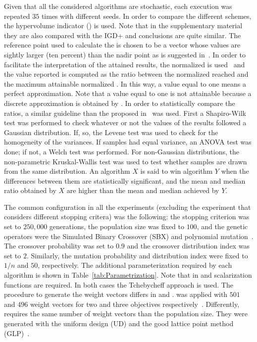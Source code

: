 Given that all the considered algorithms are stochastic, each execution was repeated $35$ times with different seeds.
%
In order to compare the different schemes, the hypervolume indicator (\HV{}) is used.
%
Note that in the supplementary material they are also compared with the IGD+ and conclusions are quite similar.
%
The reference point used to calculate the \HV{} is chosen to be a vector whose values are sightly larger (ten percent) than the nadir point 
as is suggested in~\cite{ishibuchi2017reference}.
%
In order to facilitate the interpretation of the attained results, the normalized \HV{} is used~\cite{li2015evolutionary}
and the value reported is computed as the ratio between the normalized \HV{} reached and the maximum attainable 
normalized \HV{}.
%
In this way, a value equal to one means a perfect approximation.
%
Note that a value equal to one is not attainable because a discrete approximation is obtained by \MOEAS{}.
%
In order to statistically compare the \HV{} ratios, a similar guideline than the proposed in~\cite{Joel:StatisticalTest} was used. 
%
First a Shapiro-Wilk test was performed to check whatever or not the values of the results followed a Gaussian distribution. 
%
If, so, the Levene test was used to check for the homogeneity of the variances. 
%
If samples had equal variance, an ANOVA test was done; if not, a Welch test was performed. 
%
For non-Gaussian distributions, the non-parametric Kruskal-Wallis test was used to test whether samples are drawn from the same distribution. 
%
An algorithm $X$ is said to win algorithm $Y$ when the differences between them are statistically significant, and the mean and median \HV{} ratio 
obtained by $X$ are higher than the mean and median achieved by $Y$.

%
The common configuration in all the experiments (excluding the experiment that considers different stopping critera) was the following: the stopping criterion was set to $250,000$ generations, 
the population size was fixed to $100$, and the genetic operators were the Simulated Binary Crossover (SBX) and polynomial 
mutation~\cite{Joel:SBX1994, Joel:Mutation}.
%
The crossover probability was set to $0.9$ and the crossover distribution index was set to $2$.
%
Similarly, the mutation probability and distribution index were fixed to $1/n$ and $50$, respectively.
%
The additional parameterization required by each algorithm is shown in Table~\ref{tab:Parametrization}.
%
Note that in \MOEAD{} and \RMOEA{} scalarization functions are required.
%
In both cases the Tchebycheff approach is used.
%
The procedure to generate the weight vectors differs in \MOEAD{} and \RMOEA{}.
%
\RMOEA{} was applied with $501$ and $496$ weight vectors for two and three objectives respectively~\cite{trautmann2013r2}.
%
Differently, \MOEAD{} requires the same number of weight vectors than the population size.
%
They were generated with the uniform design (UD) and the good lattice point method (GLP)~\cite{Joel:MOEAD_Uniform_Design, Joel:Kuhn_Munkres}.

